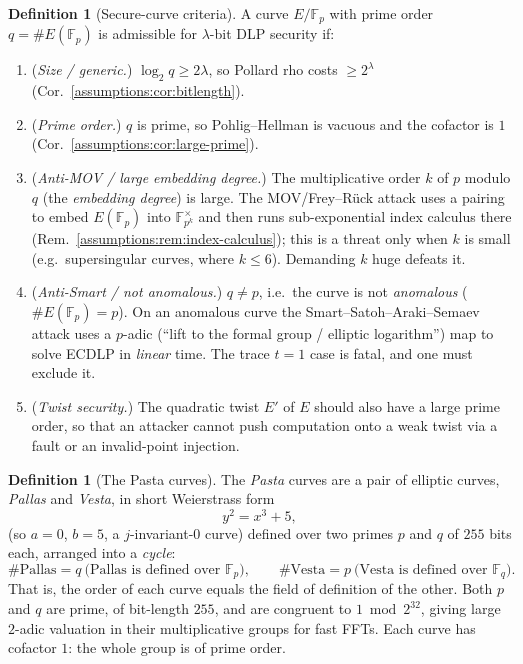 \documentclass[11pt,a4paper]{article}
\theoremstyle{definition}
\newtheorem{definition}[theorem]{Definition}
\theoremstyle{remark}
\newcommand{\F}{\ensuremath{\mathbb{F}}}
\newcommand{\Fp}{\ensuremath{\mathbb{F}_{p}}}
\newcommand{\Fq}{\ensuremath{\mathbb{F}_{q}}}
\begin{document}
\begin{definition}[Secure-curve criteria]
\label{assumptions:def:secure-curve}
A curve \(E/\Fp\) with prime order \(q = \#E(\Fp)\) is admissible for \(\lambda\)-bit DLP security if:
\begin{enumerate}
\item (\emph{Size / generic.}) \(\log_2 q \ge 2\lambda\), so Pollard rho costs \(\ge 2^{\lambda}\) (Cor.~\ref{assumptions:cor:bitlength}).
\item (\emph{Prime order.}) \(q\) is prime, so Pohlig--Hellman is vacuous and the cofactor is \(1\) (Cor.~\ref{assumptions:cor:large-prime}).
\item (\emph{Anti-MOV / large embedding degree.}) The multiplicative order \(k\) of \(p\) modulo \(q\) (the \emph{embedding degree}) is large. The MOV/Frey--Rück attack uses a pairing to embed \(E(\Fp)\) into \(\F_{p^{k}}^{\times}\) and then runs sub-exponential index calculus there (Rem.~\ref{assumptions:rem:index-calculus}); this is a threat only when \(k\) is small (e.g.\ supersingular curves, where \(k \le 6\)). Demanding \(k\) huge defeats it.
\item (\emph{Anti-Smart / not anomalous.}) \(q \ne p\), i.e.\ the curve is not \emph{anomalous} (\(\#E(\Fp) = p\)). On an anomalous curve the Smart--Satoh--Araki--Semaev attack uses a \(p\)-adic (``lift to the formal group / elliptic logarithm'') map to solve ECDLP in \emph{linear} time. The trace \(t = 1\) case is fatal, and one must exclude it.
\item (\emph{Twist security.}) The quadratic twist \(E'\) of \(E\) should also have a large prime order, so that an attacker cannot push computation onto a weak twist via a fault or an invalid-point injection.
\end{enumerate}
\end{definition}

\begin{definition}[The Pasta curves]
\label{assumptions:def:pasta}
The \emph{Pasta} curves are a pair of elliptic curves, \emph{Pallas} and \emph{Vesta}, in short Weierstrass form
\[
y^2 = x^3 + 5,
\]
(so \(a = 0\), \(b = 5\), a \(j\)-invariant-\(0\) curve) defined over two primes \(p\) and \(q\) of \(255\) bits each, arranged into a \emph{cycle}:
\[
\#\mathrm{Pallas} = q \ \text{(Pallas is defined over }\Fp\text{)}, \qquad
\#\mathrm{Vesta} = p \ \text{(Vesta is defined over }\Fq\text{)}.
\]
That is, the order of each curve equals the field of definition of the other. Both \(p\) and \(q\) are prime, of bit-length \(255\), and are congruent to \(1 \bmod{2^{32}}\), giving large \(2\)-adic valuation in their multiplicative groups for fast FFTs. Each curve has cofactor \(1\): the whole group is of prime order.
\end{definition}
\end{document}
